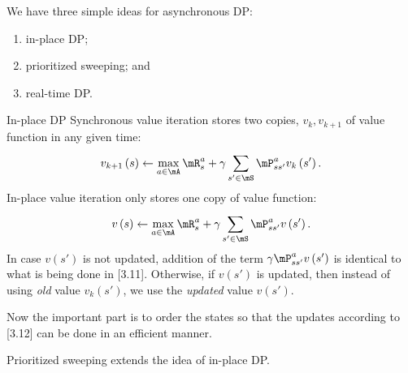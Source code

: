 \documentclass[RL]{subfiles}
\begin{document}
    We have three simple ideas for asynchronous DP:
    \begin{enumerate}
        \item in-place DP;
        \item prioritized sweeping; and
        \item real-time DP.
    \end{enumerate}

    \begin{boxy}{\stfont In-place DP}
        Synchronous value iteration stores two copies, $v_{k},v_{k+1}$ of value function in any given time:
        \begin{equation}
            v_{k+1}\left( s \right) \leftarrow \max_{a\in\mA} \mR^a_s + \gamma \sum^{}_{s'\in\mS}\mP^a_{ss'}v_{k}\left( s' \right).
        \end{equation}
        In-place value iteration only stores one copy of value function:
        \begin{equation}
            v\left( s \right) \leftarrow \max_{a\in\mA} \mR^a_s + \gamma \sum^{}_{s'\in\mS}\mP^a_{ss'}v\left( s' \right).
        \end{equation}
        In case $v\left( s' \right)$ is not updated, addition of the term $\gamma\mP^a_{ss'}v\left( s' \right)$ is identical to what is being done in [3.11]. Otherwise, if $v\left( s' \right)$ is updated, then instead of using \textit{old} value $v_k\left( s' \right)$, we use the \textit{updated} value $v\left( s' \right)$. 

        Now the important part is to order the states so that the updates according to [3.12] can be done in an efficient manner. 
    \end{boxy}

    \np Prioritized sweeping extends the idea of in-place DP.
\end{document}
